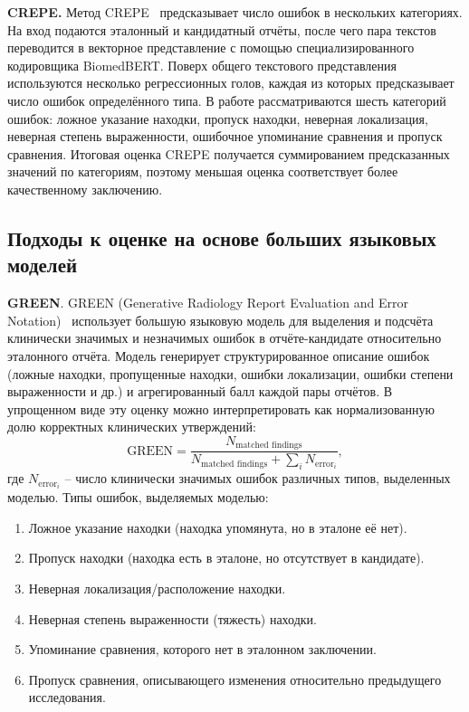 \textbf{CREPE.}
Метод CREPE~\cite{cho2025crepe} предсказывает число ошибок в нескольких категориях. На вход подаются эталонный и кандидатный отчёты, после чего пара текстов переводится в векторное представление с помощью специализированного кодировщика BiomedBERT. Поверх общего текстового представления используются несколько регрессионных голов, каждая из которых предсказывает число ошибок определённого типа. В работе рассматриваются шесть категорий ошибок: ложное указание находки, пропуск находки, неверная локализация, неверная степень выраженности, ошибочное упоминание сравнения и пропуск сравнения. Итоговая оценка CREPE получается суммированием предсказанных значений по категориям, поэтому меньшая оценка соответствует более качественному заключению.

\subsection{Подходы к оценке на основе больших языковых моделей}

\textbf{GREEN}. GREEN (Generative Radiology Report Evaluation and Error Notation)~\cite{ostmeier2024green} использует большую языковую модель для выделения и подсчёта клинически значимых и незначимых ошибок в отчёте-кандидате относительно эталонного отчёта. Модель генерирует структурированное описание ошибок (ложные находки, пропущенные находки, ошибки локализации, ошибки степени выраженности и др.) и агрегированный балл каждой пары отчётов. В упрощенном виде эту оценку можно интерпретировать как нормализованную долю корректных клинических утверждений:
\[
\mathrm{GREEN} = \frac{N_{\text{matched findings}}}{N_{\text{matched findings}} + \sum_i N_{\text{error}_i}},
\]
где $N_{\text{error}_i}$ -- число клинически значимых ошибок различных типов, выделенных моделью. Типы ошибок, выделяемых моделью:
\begin{enumerate}
    \item Ложное указание находки (находка упомянута, но в эталоне её нет).
    \item Пропуск находки (находка есть в эталоне, но отсутствует в кандидате).
    \item Неверная локализация/расположение находки.
    \item Неверная степень выраженности (тяжесть) находки.
    \item Упоминание сравнения, которого нет в эталонном заключении.
    \item Пропуск сравнения, описывающего изменения относительно предыдущего исследования.
\end{enumerate}


